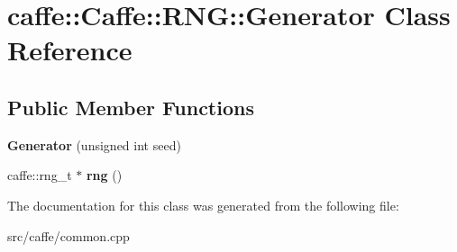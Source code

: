 \hypertarget{classcaffe_1_1Caffe_1_1RNG_1_1Generator}{}\section{caffe\+:\+:Caffe\+:\+:R\+NG\+:\+:Generator Class Reference}
\label{classcaffe_1_1Caffe_1_1RNG_1_1Generator}
\subsection*{Public Member Functions}
\begin{DoxyCompactItemize}
\item 
{\bfseries Generator} (unsigned int seed)\hypertarget{classcaffe_1_1Caffe_1_1RNG_1_1Generator_a25f41946ec93504bb7b132ef5072c0fc}{}\label{classcaffe_1_1Caffe_1_1RNG_1_1Generator_a25f41946ec93504bb7b132ef5072c0fc}

\item 
caffe\+::rng\+\_\+t $\ast$ {\bfseries rng} ()\hypertarget{classcaffe_1_1Caffe_1_1RNG_1_1Generator_a43c97cbef420858b7f611396cc5093bf}{}\label{classcaffe_1_1Caffe_1_1RNG_1_1Generator_a43c97cbef420858b7f611396cc5093bf}

\end{DoxyCompactItemize}


The documentation for this class was generated from the following file\+:\begin{DoxyCompactItemize}
\item 
src/caffe/common.\+cpp\end{DoxyCompactItemize}
